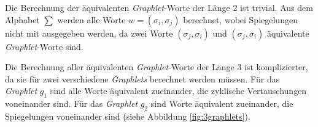 \documentclass{report}
\begin{document}
Die Berechnung der \"aquivalenten \textit{Graphlet}-Worte der L\"ange 2 ist trivial. Aus dem Alphabet $\sum$ werden alle Worte $w = (\sigma_i, \sigma_j)$ berechnet, wobei Spiegelungen nicht mit ausgegeben werden, da zwei Worte $ (\sigma_j, \sigma_i) $ und $ (\sigma_j, \sigma_i) $ \"aquivalente \textit{Graphlet}-Worte sind.

Die Berechnung aller \"aquivalenten \textit{Graphlet}-Worte der L\"ange 3 ist komplizierter, da sie f\"ur zwei verschiedene \textit{Graphlets} berechnet werden m\"ussen. F\"ur das \textit{Graphlet} $g_1$ sind alle Worte \"aquivalent zueinander, die zyklische Vertauschungen voneinander sind. F\"ur das \textit{Graphlet} $g_2$ sind Worte \"aquivalent zueinander, die Spiegelungen voneinander sind (siehe Abbildung \ref{fig:3graphlets}). \\



%
%
\end{document}
